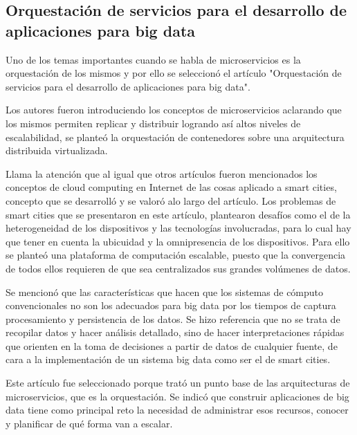 \subsection{Orquestación de servicios para el desarrollo de aplicaciones para big data
}

Uno de los temas importantes cuando se habla de microservicios es la orquestación de los mismos y por ello se seleccionó el artículo "Orquestación de servicios para el desarrollo de aplicaciones para big data"\cite{orquestacion}.\par

Los autores fueron introduciendo los conceptos de microservicios aclarando que los mismos permiten replicar y distribuir logrando así altos niveles de escalabilidad, se planteó la orquestación de contenedores sobre una arquitectura distribuida virtualizada.\par

Llama la atención que al igual que otros artículos fueron mencionados los conceptos de cloud computing en Internet de las cosas aplicado a smart cities, concepto que se desarrolló y se valoró alo largo del artículo. Los problemas de smart cities que se presentaron en este artículo, plantearon desafíos como el de la heterogeneidad de los dispositivos y las tecnologías involucradas, para lo cual hay que tener en cuenta la ubicuidad y la omnipresencia de los dispositivos.
Para ello se planteó una plataforma de computación escalable, puesto que la convergencia de todos ellos requieren de que sea centralizados sus grandes  volúmenes de datos.\par

Se mencionó que las características que hacen que los sistemas de cómputo convencionales no son los adecuados para big data por los tiempos de captura procesamiento y persistencia de los datos. Se hizo referencia que no se trata de recopilar datos y hacer análisis detallado, sino de hacer interpretaciones rápidas que orienten en la toma de decisiones a partir de datos de cualquier fuente, de cara a la implementación de un sistema big data como ser el de smart cities.\par

Este artículo fue seleccionado porque trató un punto base de las arquitecturas de microservicios, que es la orquestación. Se indicó que construir aplicaciones de big data tiene como principal reto la necesidad de administrar esos recursos, conocer y planificar de qué forma van a escalar.\par

